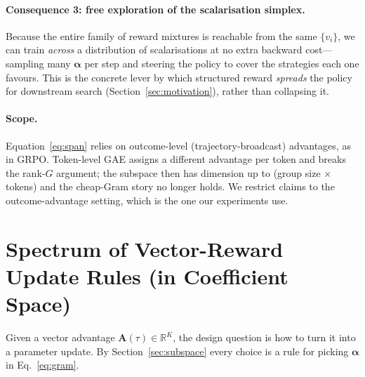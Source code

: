 \documentclass[11pt,a4paper]{article}
\newcommand{\R}{\mathbb{R}}
\begin{document}
\paragraph{Consequence 3: free exploration of the scalarisation simplex.}
Because the entire family of reward mixtures is reachable from the same
$\{v_i\}$, we can train \emph{across} a distribution of scalarisations at no
extra backward cost---sampling many $\bm\alpha$ per step and steering the
policy to cover the strategies each one favours.  This is the concrete lever
by which structured reward \emph{spreads} the policy for downstream search
(Section~\ref{sec:motivation}), rather than collapsing it.

\paragraph{Scope.}
Equation~\eqref{eq:span} relies on outcome-level (trajectory-broadcast)
advantages, as in GRPO.  Token-level GAE assigns a different advantage per
token and breaks the rank-$G$ argument; the subspace then has dimension up to
(group size $\times$ tokens) and the cheap-Gram story no longer holds.  We
restrict claims to the outcome-advantage setting, which is the one our
experiments use.

\section{Spectrum of Vector-Reward Update Rules (in Coefficient Space)}
\label{sec:spectrum}

Given a vector advantage $\bm{A}(\tau) \in \R^K$, the design question is how
to turn it into a parameter update.  By Section~\ref{sec:subspace} every
choice is a rule for picking $\bm\alpha$ in Eq.~\eqref{eq:gram}.
\end{document}

